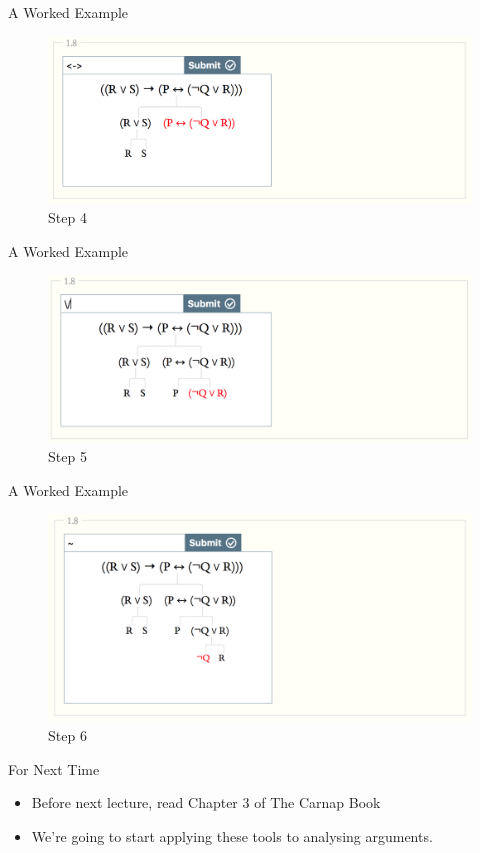 \documentclass[
  ignorenonframetext,
]{beamer}
\providecommand{\tightlist}{%
  \setlength{\itemsep}{0pt}\setlength{\parskip}{0pt}}
\renewcommand{\,}{\text{, }}
\begin{document}
\begin{frame}{A Worked Example}
\protect\hypertarget{a-worked-example-3}{}

\begin{figure}
\centering
\includegraphics{../images/class02/4.png}
\caption{Step 4}
\end{figure}

\end{frame}

\begin{frame}{A Worked Example}
\protect\hypertarget{a-worked-example-4}{}

\begin{figure}
\centering
\includegraphics{../images/class02/5.png}
\caption{Step 5}
\end{figure}

\end{frame}

\begin{frame}{A Worked Example}
\protect\hypertarget{a-worked-example-5}{}

\begin{figure}
\centering
\includegraphics{../images/class02/6.png}
\caption{Step 6}
\end{figure}

\end{frame}

\begin{frame}{For Next Time}
\protect\hypertarget{for-next-time}{}

\begin{itemize}
\tightlist
\item
  Before next lecture, read Chapter 3 of The Carnap Book
\item
  We're going to start applying these tools to analysing arguments.
\end{itemize}

\end{frame}
\end{document}
